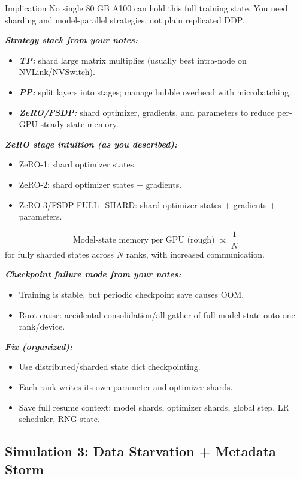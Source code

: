 \documentclass[12pt]{article}
\let\origtextbf\textbf
\renewcommand{\textbf}[1]{\origtextbf{\textit{#1}}}
\begin{document}
\begin{redbox}{Implication}
No single 80 GB A100 can hold this full training state.  
You need sharding and model-parallel strategies, not plain replicated DDP.
\end{redbox}

\textbf{Strategy stack from your notes:}
\begin{itemize}
\item \textbf{TP:} shard large matrix multiplies (usually best intra-node on NVLink/NVSwitch).
\item \textbf{PP:} split layers into stages; manage bubble overhead with microbatching.
\item \textbf{ZeRO/FSDP:} shard optimizer, gradients, and parameters to reduce per-GPU steady-state memory.
\end{itemize}

\textbf{ZeRO stage intuition (as you described):}
\begin{itemize}
\item ZeRO-1: shard optimizer states.
\item ZeRO-2: shard optimizer states + gradients.
\item ZeRO-3/FSDP FULL\_SHARD: shard optimizer states + gradients + parameters.
\end{itemize}

\[
\text{Model-state memory per GPU (rough)} \;\propto\; \frac{1}{N}
\]
for fully sharded states across \(N\) ranks, with increased communication.

\textbf{Checkpoint failure mode from your notes:}
\begin{itemize}
\item Training is stable, but periodic checkpoint save causes OOM.
\item Root cause: accidental consolidation/all-gather of full model state onto one rank/device.
\end{itemize}

\textbf{Fix (organized):}
\begin{itemize}
\item Use distributed/sharded state dict checkpointing.
\item Each rank writes its own parameter and optimizer shards.
\item Save full resume context: model shards, optimizer shards, global step, LR scheduler, RNG state.
\end{itemize}

\subsection{Simulation 3: Data Starvation + Metadata Storm}
\end{document}
